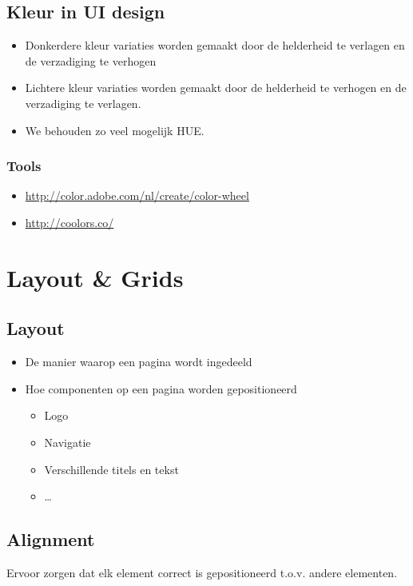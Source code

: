 \documentclass{article}
\begin{document}
\subsection{Kleur in UI design}
\begin{itemize}
    \item Donkerdere kleur variaties worden gemaakt door de helderheid te verlagen en de verzadiging te verhogen
    \item Lichtere kleur variaties worden gemaakt door de helderheid te verhogen en de verzadiging te verlagen.
    \item We behouden zo veel mogelijk HUE.
\end{itemize}

\subsubsection{Tools}
\begin{itemize}
    \item \url{http://color.adobe.com/nl/create/color-wheel}
    \item \url{http://coolors.co/}
\end{itemize}

\section{Layout \& Grids}

\subsection{Layout}
\begin{itemize}
    \item De manier waarop een pagina wordt ingedeeld
    \item Hoe componenten op een pagina worden gepositioneerd
    \begin{itemize}
        \item Logo
        \item Navigatie
        \item Verschillende titels en tekst
        \item \dots
    \end{itemize}
\end{itemize}

\subsection{Alignment}
Ervoor zorgen dat elk element correct is gepositioneerd t.o.v. andere elementen.
\end{document}
